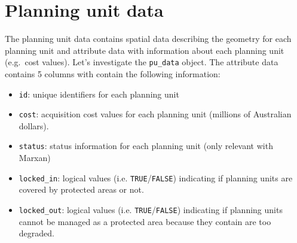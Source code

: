 \documentclass[12pt,]{book}
\newenvironment{Shaded}{\begin{snugshade}}{\end{snugshade}}
\newcommand{\KeywordTok}[1]{\textcolor[rgb]{0.13,0.29,0.53}{\textbf{#1}}}
\newcommand{\StringTok}[1]{\textcolor[rgb]{0.31,0.60,0.02}{#1}}
\newcommand{\CommentTok}[1]{\textcolor[rgb]{0.56,0.35,0.01}{\textit{#1}}}
\newcommand{\OperatorTok}[1]{\textcolor[rgb]{0.81,0.36,0.00}{\textbf{#1}}}
\newcommand{\NormalTok}[1]{#1}
\providecommand{\tightlist}{%
  \setlength{\itemsep}{0pt}\setlength{\parskip}{0pt}}
\begin{document}
\begin{Shaded}
\end{Shaded}

\clearpage

\section{Planning unit data}\label{planning-unit-data}

The planning unit data contains spatial data describing the geometry for
each planning unit and attribute data with information about each
planning unit (e.g.~cost values). Let's investigate the
\texttt{pu\_data} object. The attribute data contains 5 columns with
contain the following information:

\begin{itemize}
\tightlist
\item
  \texttt{id}: unique identifiers for each planning unit
\item
  \texttt{cost}: acquisition cost values for each planning unit
  (millions of Australian dollars).
\item
  \texttt{status}: status information for each planning unit (only
  relevant with Marxan)
\item
  \texttt{locked\_in}: logical values (i.e.
  \texttt{TRUE}/\texttt{FALSE}) indicating if planning units are covered
  by protected areas or not.
\item
  \texttt{locked\_out}: logical values (i.e.
  \texttt{TRUE}/\texttt{FALSE}) indicating if planning units cannot be
  managed as a protected area because they contain are too degraded.
\end{itemize}
\end{document}
